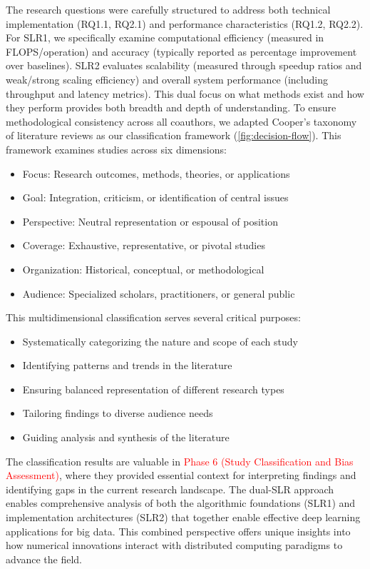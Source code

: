 \documentclass[acmsmall]{acmart}
\newcommand{\ATM}[1]{\textcolor{red}{#1}}
\begin{document}
The research questions were carefully structured to address both technical implementation (RQ1.1, RQ2.1) and performance characteristics (RQ1.2, RQ2.2). For SLR1, we specifically examine computational efficiency (measured in FLOPS/operation) and accuracy (typically reported as percentage improvement over baselines). SLR2 evaluates scalability (measured through speedup ratios and weak/strong scaling efficiency) and overall system performance (including throughput and latency metrics). This dual focus on what methods exist and how they perform provides both breadth and depth of understanding.
To ensure methodological consistency across all coauthors, we adapted Cooper's taxonomy of literature reviews \citet{cooper1988organizing} as our classification framework (\cref{fig:decision-flow}). This framework examines studies across six dimensions:
\begin{itemize}
    \item Focus: Research outcomes, methods, theories, or applications
    \item Goal: Integration, criticism, or identification of central issues
    \item Perspective: Neutral representation or espousal of position
    \item Coverage: Exhaustive, representative, or pivotal studies
    \item Organization: Historical, conceptual, or methodological
    \item Audience: Specialized scholars, practitioners, or general public
\end{itemize}
This multidimensional classification serves several critical purposes:
\begin{itemize}
    \item Systematically categorizing the nature and scope of each study
    \item Identifying patterns and trends in the literature
    \item Ensuring balanced representation of different research types
    \item Tailoring findings to diverse audience needs
    \item Guiding analysis and synthesis of the literature
\end{itemize}
The classification results are valuable in \ATM{Phase 6 (Study Classification and Bias Assessment)}, where they provided essential context for interpreting findings and identifying gaps in the current research landscape. The dual-SLR approach enables comprehensive analysis of both the algorithmic foundations (SLR1) and implementation architectures (SLR2) that together enable effective deep learning applications for big data. This combined perspective offers unique insights into how numerical innovations interact with distributed computing paradigms to advance the field.
\end{document}
